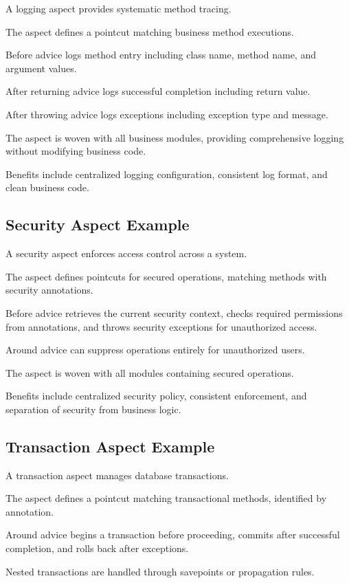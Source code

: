 \documentclass[11pt]{article}
\begin{document}
A logging aspect provides systematic method tracing.

The aspect defines a pointcut matching business method executions.

Before advice logs method entry including class name, method name, and argument values.

After returning advice logs successful completion including return value.

After throwing advice logs exceptions including exception type and message.

The aspect is woven with all business modules, providing comprehensive logging without modifying business code.

Benefits include centralized logging configuration, consistent log format, and clean business code.

\subsection{Security Aspect Example}

A security aspect enforces access control across a system.

The aspect defines pointcuts for secured operations, matching methods with security annotations.

Before advice retrieves the current security context, checks required permissions from annotations, and throws security exceptions for unauthorized access.

Around advice can suppress operations entirely for unauthorized users.

The aspect is woven with all modules containing secured operations.

Benefits include centralized security policy, consistent enforcement, and separation of security from business logic.

\subsection{Transaction Aspect Example}

A transaction aspect manages database transactions.

The aspect defines a pointcut matching transactional methods, identified by annotation.

Around advice begins a transaction before proceeding, commits after successful completion, and rolls back after exceptions.

Nested transactions are handled through savepoints or propagation rules.
\end{document}
